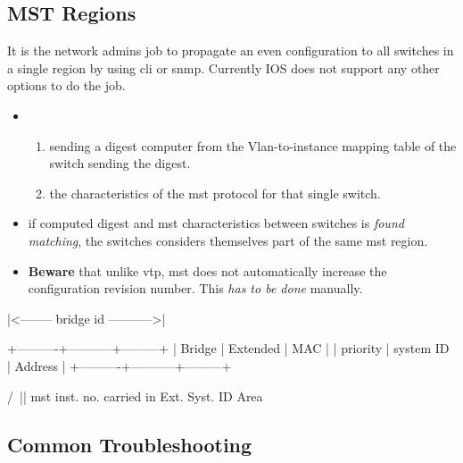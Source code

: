 \subsection{MST Regions}

It is the network admins job to propagate an even configuration to all switches in a single region by using \gls{cli} or \gls{snmp}. Currently IOS does not support any other options to do the job.

\begin{itemize}
    \item {}
    \begin{enumerate}
        \item sending a digest computer from the Vlan-to-instance mapping table of the switch sending the digest.
        \item the characteristics of the \gls{mst} protocol for that single switch.
    \end{enumerate}
    \item if computed digest and \gls{mst} characteristics between switches is \textit{found matching}, the switches considers themselves part of the same \gls{mst} region.
    \item \textbf{Beware} that unlike \gls{vtp}, \gls{mst} does not automatically increase the configuration revision number. This \textit{has to be done} manually.
\end{itemize}



\pagebreak %

\begin{txt}
|<-------- bridge id ----------->|

+----------+-----------+---------+
| Bridge   | Extended  | MAC     |
| priority | system ID | Address |
+----------+-----------+---------+

                /\
                ||
    \gls{mst} inst. no. carried in
      Ext. Syst. ID Area
\end{txt}

\subsection{Common Troubleshooting}

